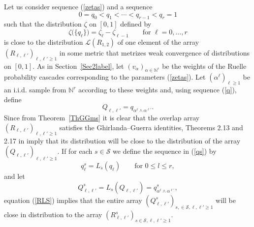 \documentclass[aop,MSNbibl,dvips]{arximspdf}
\def\cal{\mathscr}
\newcommand{\spe}{{\cal S}}
\newcommand{\LL}{{\cal L}}
\newcommand{\Natural}{\mathbb{N}}
\begin{document}
Let us consider sequence (\ref{zetas}) and a sequence
%
\begin{equation}
0=q_0< q_1 < \cdots< q_{r-1}< q_r
=1 \label{q}
\end{equation}
%
such that the distribution $\zeta$ on $[0,1]$ defined by
%
\begin{equation}
\zeta \bigl( \{q_\ell \} \bigr) = \zeta_{\ell} - \zeta
_{\ell-1} \qquad\mbox{for } \ell=0,\ldots, r \label{zetafop}
\end{equation}
%
is close to the distribution $\LL(R_{1,2})$ of one element of the array
$(R_{\ell,\ell'})_{\ell,\ell'\geq1}$ in some metric that metrizes weak
convergence of distributions on $[0,1]$. As in Section~\ref{Sec2label},
let $(v_\alpha)_{\alpha\in\Natural^r}$ be the weights of the Ruelle
probability cascades corresponding to the parameters (\ref{zetas}). Let
$(\alpha^\ell)_{\ell\geq1}$ be an i.i.d. sample from $\Natural^r$
according to these weights and, using sequence (\ref{q}), define
%
\begin{equation}
Q_{\ell,\ell'} = q_{\alpha^\ell\wedge\alpha^{\ell'}}.
\end{equation}
%
Since from Theorem~\ref{ThGGms} it is clear that the overlap array
$(R_{\ell,\ell'})_{\ell,\ell'\geq1}$ satisfies the Ghirlanda--Guerra
identities, Theorems 2.13 and 2.17 in \cite{SKmodel} imply that its
distribution will be close to the distribution of the array $(Q_{\ell
,\ell'})_{\ell,\ell'\geq1}$. If for each $s\in\spe$ we define the
sequence in (\ref{qs}) by
%
\begin{equation}
q^s_\ell= L_s(q_\ell)\qquad \mbox{for } 0
\leq l\leq r, \label{zetafops}
\end{equation}
%
and let
%
\begin{equation}
Q^s_{\ell,\ell'} = L_s(Q_{\ell,\ell'}) =
q^s_{\alpha^\ell\wedge
\alpha
^{\ell'}}, \label{QLS}
\end{equation}
%
equation (\ref{RLS}) implies that the entire array $(Q^s_{\ell,\ell
'})_{s,\in\spe, \ell,\ell'\geq1}$ will be close in distribution to the
array $(R^s_{\ell,\ell'})_{s\in\spe, \ell,\ell'\geq1}$.
\end{document}
